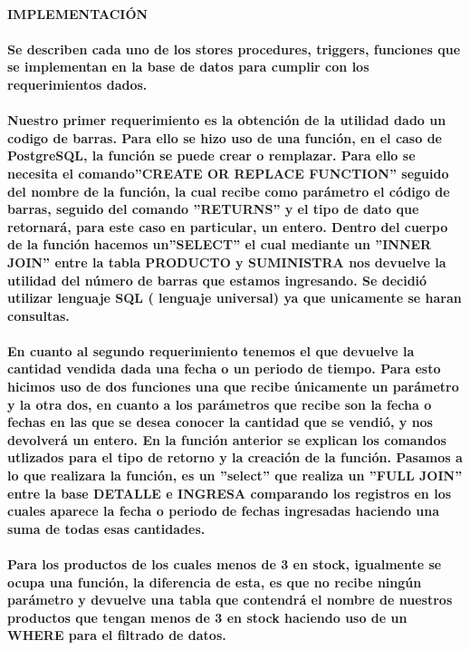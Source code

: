 \documentclass{article}
\begin{document}
    \paragraph{IMPLEMENTACIÓN}
	 \paragraph{Se describen cada uno de los stores procedures, triggers, funciones que se implementan en la base de datos para cumplir con los requerimientos dados.}
	 
	 \paragraph{Nuestro primer requerimiento es la obtención de la utilidad dado un codigo de barras. Para ello se hizo uso de una función, en el caso de PostgreSQL, la función se puede crear o remplazar. Para ello se necesita el comando''CREATE OR REPLACE FUNCTION'' seguido del nombre de la función, la cual recibe como parámetro el código de barras, seguido del comando ''RETURNS'' y el tipo de dato que retornará, para este caso en particular, un entero. Dentro del cuerpo de la función hacemos un''SELECT'' el cual mediante un ''INNER JOIN'' entre la tabla PRODUCTO y SUMINISTRA nos devuelve la utilidad del número de barras que estamos ingresando. Se decidió utilizar lenguaje SQL ( lenguaje universal) ya que unicamente se haran consultas.}
	 
	 \paragraph{En cuanto al segundo requerimiento tenemos el que devuelve la cantidad vendida dada una fecha o un periodo de tiempo. Para esto hicimos uso de dos funciones una que recibe únicamente un parámetro y la otra dos, en cuanto a los parámetros que recibe son la fecha o fechas en las que se desea conocer la cantidad que se vendió, y nos devolverá un entero. En la función anterior se explican los comandos utlizados para el tipo de retorno y la creación de la función. Pasamos a lo que realizara la función, es un ''select'' que realiza un ''FULL JOIN'' entre la base DETALLE e INGRESA comparando los registros en los cuales aparece la fecha o periodo de fechas ingresadas haciendo una suma de todas esas cantidades. }
	 
	 \paragraph{Para los productos de los cuales menos de 3 en stock, igualmente se ocupa una función, la diferencia de esta, es que no recibe ningún parámetro y devuelve una tabla que contendrá el nombre de nuestros productos que tengan menos de 3 en stock haciendo uso de un WHERE para el filtrado de datos.}
	 
\end{document}
